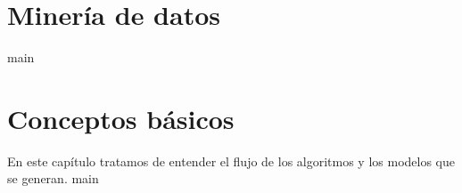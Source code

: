 \chapter{Minería de datos}
{main}
\chapter{Conceptos básicos}
En este capítulo tratamos de entender el flujo de los algoritmos y los modelos que se generan. 
{main}